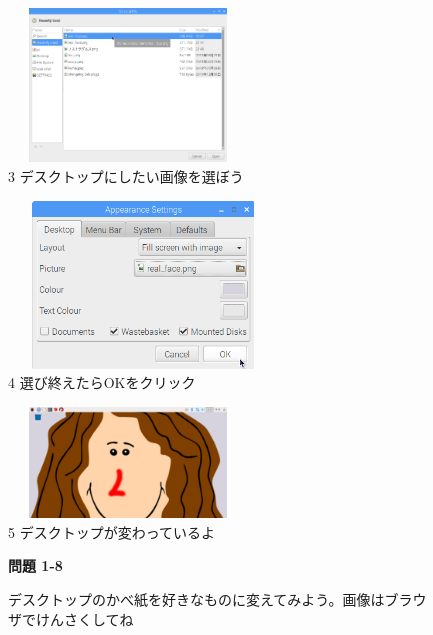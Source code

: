 \documentclass[a4paper,12pt]{jarticle}
\begin{document}
\begin{figure}
\begin{minipage}{\textwidth}
\begin{minipage}{6.376cm}
\includegraphics[width=6.347cm,height=4.084cm]{textbook-img110.png}\\
3 デスクトップにしたい画像を選ぼう
\end{minipage}
\begin{minipage}{2.582cm}
\end{minipage}
\begin{minipage}{5.737cm}
\includegraphics[width=7.145cm,height=4.451cm]{textbook-img109.png}\\
4 選び終えたらOKをクリック
\end{minipage}

\end{minipage}

\bigskip


\flushleft
\begin{minipage}{6.134cm}
\includegraphics[width=6.347cm,height=2.945cm]{textbook-img111.png}\\
5 デスクトップが変わっているよ
\end{minipage}

\bigskip

{\bfseries
問題 1-8}

デスクトップのかべ紙を好きなものに変えてみよう。画像はブラウザでけんさくしてね
\end{figure}
\end{document}
